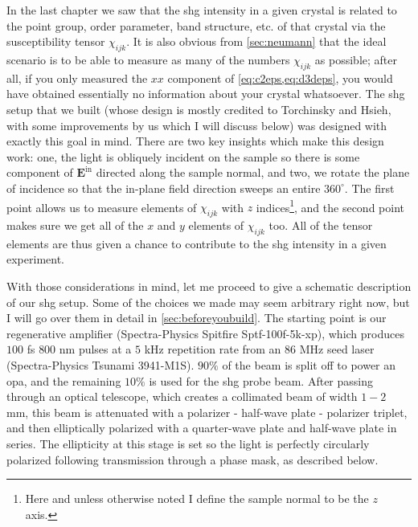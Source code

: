 In the last chapter we saw that the \gls{shg} intensity in a given crystal is related to the point group, order parameter, band structure, etc. of that crystal via the susceptibility tensor $\chi_{ijk}$.
It is also obvious from \cref{sec:neumann} that the ideal scenario is to be able to measure as many of the numbers $\chi_{ijk}$ as possible; after all, if you only measured the $xx$ component of \cref{eq:c2eps,eq:d3deps}, you would have obtained essentially no information about your crystal whatsoever.
The \gls{shg} setup that we built (whose design is mostly credited to Torchinsky and Hsieh\citep{torchinsky_low_2014}, with some improvements by us which I will discuss below) was designed with exactly this goal in mind.
There are two key insights which make this design work: one, the light is obliquely incident on the sample so there is some component of $\bm{E}^\mathrm{in}$ directed along the sample normal, and two, we rotate the plane of incidence so that the in-plane field direction sweeps an entire $360^\circ$.
The first point allows us to measure elements of $\chi_{ijk}$ with $z$ indices\footnote{Here and unless otherwise noted I define the sample normal to be the $z$ axis.}, and the second point makes sure we get all of the $x$ and $y$ elements of $\chi_{ijk}$ too.
All of the tensor elements are thus given a chance to contribute to the \gls{shg} intensity in a given experiment.

With those considerations in mind, let me proceed to give a schematic description of our \gls{shg} setup.
Some of the choices we made may seem arbitrary right now, but I will go over them in detail in \cref{sec:beforeyoubuild}.
The starting point is our regenerative amplifier (Spectra-Physics Spitfire Sptf-100f-5k-xp), which produces $100$ \si{fs} $800$ \si{nm} pulses at a $5$ \si{kHz} repetition rate from an $86$ \si{MHz} seed laser (Spectra-Physics Tsunami 3941-M1S). 
$90\%$ of the beam is split off to power an \gls{opa}, and the remaining $10\%$ is used for the \gls{shg} probe beam.
After passing through an optical telescope, which creates a collimated beam of width $1-2$ \si{mm}, this beam is attenuated with a polarizer - half-wave plate - polarizer triplet, and then elliptically polarized with a quarter-wave plate and half-wave plate in series.
The ellipticity at this stage is set so the light is perfectly circularly polarized following transmission through a phase mask, as described below.


